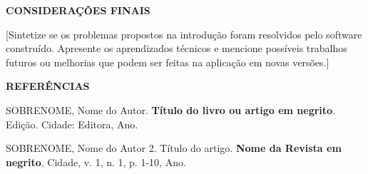 \documentclass[12pt, a4paper]{article}
\newcommand{\titlesection}[1]{
    \vspace{1.5em}
    \noindent\textbf{\MakeUppercase{#1}}
    \vspace{1em}\par
}
\begin{document}
\titlesection{CONSIDERAÇÕES FINAIS}
[Sintetize se os problemas propostos na introdução foram resolvidos pelo software construído. Apresente os aprendizados técnicos e mencione possíveis trabalhos futuros ou melhorias que podem ser feitas na aplicação em novas versões.]

\begin{center}
    \vspace{1.5em}
    \textbf{REFERÊNCIAS}
    \vspace{1em}
\end{center}

\begin{singlespace}
\noindent SOBRENOME, Nome do Autor. \textbf{Título do livro ou artigo em negrito}. Edição. Cidade: Editora, Ano.

\vspace{1em}
\noindent SOBRENOME, Nome do Autor 2. Título do artigo. \textbf{Nome da Revista em negrito}, Cidade, v. 1, n. 1, p. 1-10, Ano.
\end{singlespace}
\end{document}
